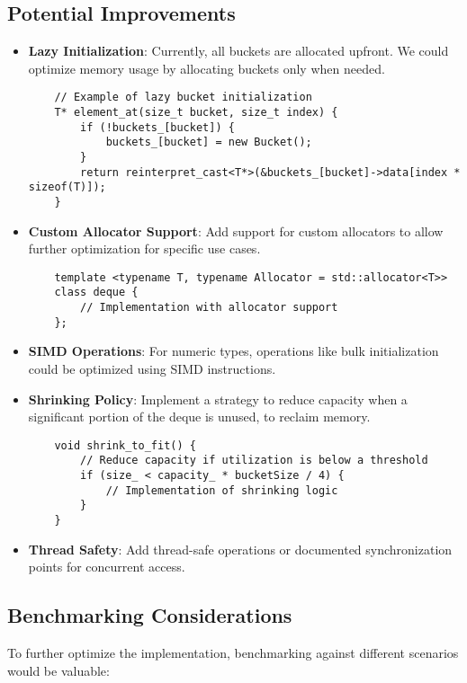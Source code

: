 \documentclass[a4paper,12pt]{article}
\begin{document}
\subsection{Potential Improvements}
\begin{itemize}
    \item \textbf{Lazy Initialization}: Currently, all buckets are allocated upfront. We could optimize memory usage by allocating buckets only when needed.
    
    \begin{lstlisting}
    // Example of lazy bucket initialization
    T* element_at(size_t bucket, size_t index) {
        if (!buckets_[bucket]) {
            buckets_[bucket] = new Bucket();
        }
        return reinterpret_cast<T*>(&buckets_[bucket]->data[index * sizeof(T)]);
    }
    \end{lstlisting}
    
    \item \textbf{Custom Allocator Support}: Add support for custom allocators to allow further optimization for specific use cases.
    
    \begin{lstlisting}
    template <typename T, typename Allocator = std::allocator<T>>
    class deque {
        // Implementation with allocator support
    };
    \end{lstlisting}
    
    \item \textbf{SIMD Operations}: For numeric types, operations like bulk initialization could be optimized using SIMD instructions.
    
    \item \textbf{Shrinking Policy}: Implement a strategy to reduce capacity when a significant portion of the deque is unused, to reclaim memory.
    
    \begin{lstlisting}
    void shrink_to_fit() {
        // Reduce capacity if utilization is below a threshold
        if (size_ < capacity_ * bucketSize / 4) {
            // Implementation of shrinking logic
        }
    }
    \end{lstlisting}
    
    \item \textbf{Thread Safety}: Add thread-safe operations or documented synchronization points for concurrent access.
\end{itemize}

\subsection{Benchmarking Considerations}
To further optimize the implementation, benchmarking against different scenarios would be valuable:
\end{document}
